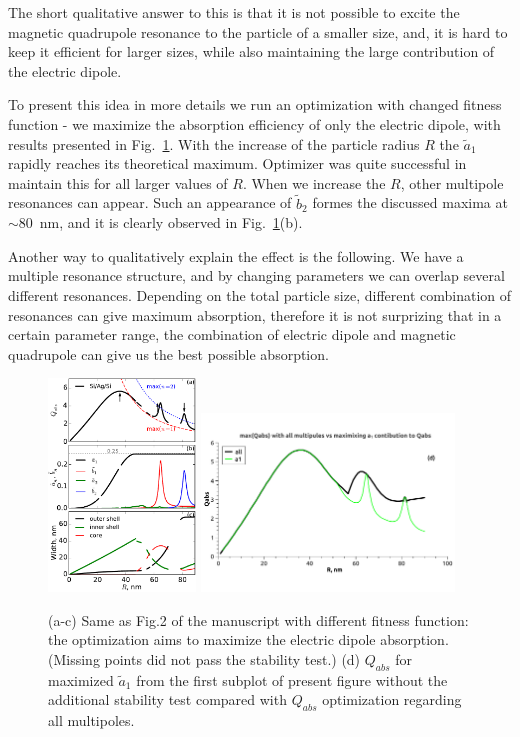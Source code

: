 \documentclass[a4paper]{article}
\begin{document}
The short qualitative answer to this is that it is not possible to
excite the magnetic quadrupole resonance to the particle of a smaller
size, and, it is hard to keep it efficient for larger sizes, while
also maintaining the large contribution of the electric dipole.

To present this idea in more details we run an optimization with
changed fitness function - we maximize the absorption efficiency of
only the electric dipole, with results presented in
Fig.~\ref{fig:a1max}. With the increase of the particle radius $R$ the
$\tilde{a}_1$ rapidly reaches its theoretical maximum. Optimizer was
quite successful in maintain this for all larger values of $R$. When
we increase the $R$, other multipole resonances can appear. Such an
appearance of $\tilde{b}_2$ formes the discussed maxima at $\sim
80$~nm, and it is clearly observed in Fig.~\ref{fig:a1max}(b).

Another way to qualitatively explain the effect is the following. We
have a multiple resonance structure, and by changing parameters we can
overlap several different resonances. Depending on the total particle
size, different combination of resonances can give maximum absorption,
therefore it is not surprizing that in a certain parameter range, the
combination of electric dipole and magnetic quadrupole can give us the
best possible absorption.

\begin{figure}
  \includegraphics[width=0.35\textwidth]{overview-Qabs-a1}
   \includegraphics[width=0.60\textwidth]{overview-Qabs-all-a1}
  \caption{(a-c) Same as Fig.2 of the manuscript with different
    fitness function: the optimization aims to maximize the electric
    dipole absorption. (Missing points did not pass the stability
    test.) (d) $Q_{abs}$ for maximized $\tilde{a}_1$ from the first
    subplot of present figure without the additional stability test
    compared with $Q_{abs}$ optimization regarding all
    multipoles.\label{fig:a1max}}
\end{figure}
\end{document}
